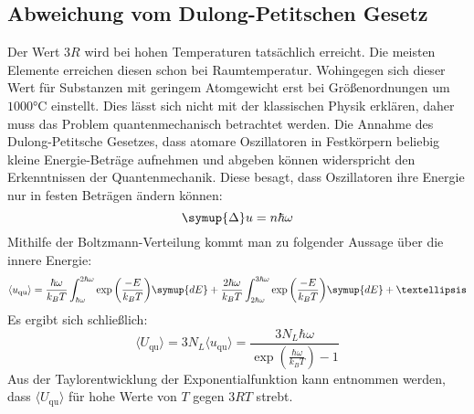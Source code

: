 \subsection{Abweichung vom Dulong-Petitschen Gesetz}
Der Wert $3R$ wird bei hohen Temperaturen tatsächlich erreicht.
Die meisten Elemente erreichen diesen schon bei Raumtemperatur.
Wohingegen sich dieser Wert für Substanzen mit geringem Atomgewicht erst bei
Größenordnungen um $1000\si{\celsius}$ einstellt.
Dies lässt sich nicht mit der klassischen Physik erklären,
daher muss das Problem quantenmechanisch betrachtet werden.
Die Annahme des Dulong-Petitsche Gesetzes, dass atomare Oszillatoren in Festkörpern
beliebig kleine Energie-Beträge aufnehmen und abgeben können widerspricht den Erkenntnissen der Quantenmechanik.
Diese besagt, dass Oszillatoren ihre Energie nur in festen Beträgen ändern können:
\begin{equation}
\symup{\Delta} u = n \hbar \omega
\end{equation}
Mithilfe der Boltzmann-Verteilung kommt man zu folgender Aussage über die innere Energie:
\begin{equation}
    \langle u_\text{qu} \rangle = \frac{\hbar\omega}{k_BT}\int_{\hbar\omega}^{2\hbar\omega}\exp{\left(\frac{-E}{k_BT}\right)}\symup{dE} +
                            \frac{2\hbar\omega}{k_BT}\int_{2\hbar\omega}^{3\hbar\omega}\exp{\left(\frac{-E}{k_BT}\right)}\symup{dE} + …
\end{equation}
Es ergibt sich schließlich:
\begin{equation}
    \langle U_\text{qu} \rangle = 3 N_L \langle u_\text{qu} \rangle = \frac{3 N_L \hbar
        \omega}{\exp{\left(\frac{\hbar\omega}{k_BT}\right)}-1}
\end{equation}
Aus der Taylorentwicklung der Exponentialfunktion kann entnommen werden,
dass $\langle U_\text{qu} \rangle$ für hohe Werte von $T$ gegen $3RT$ strebt.
